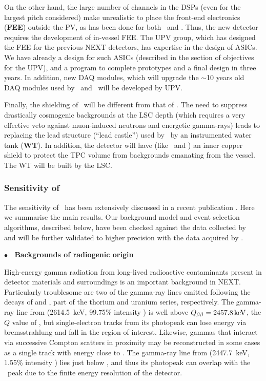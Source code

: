 \indent

On the other hand, the large number of channels in the DSPs (even for the largest pitch considered) make unrealistic to place the front-end electronics ({\bf FEE}) outside the PV, as has been done for both \NEW\ and \Next. Thus, the new detector requires the development of in-vessel FEE. The UPV group, which has designed the FEE for the previous NEXT detectors, has expertise in the design of ASICs. We have already a design for such ASICs (described in the section of objectives for the UPV), and a program to complete prototypes and a final design in three years. In addition, new DAQ modules, which will upgrade the $\sim$10 years old DAQ modules used by \NEW\ and \Next\ will be developed by UPV. 

\indent

Finally, the shielding of \NHD\ will be different from that of \Next. The need to suppress drastically cosmogenic backgrounds at the LSC depth (which requires a very effective veto against muon-induced neutrons and energetic gamma-rays) leads to replacing the lead structure (``lead castle'') used by \Next\ by an instrumented water tank ({\bf WT}). In addition, the detector will have (like \NEW\ and \Next) an inner copper shield to protect the TPC volume from backgrounds emanating from the vessel. The WT will be built by the LSC. 


\subsubsection{Sensitivity of \NHD}
\label{sec:BackgroundsAtTheTonneScale}

The sensitivity of \NHD\ has been extensively discussed in a recent publication \cite{NEXT:2020amj}. Here we summarise the main results. 
Our background model and event selection algorithms, described below, have been checked against the data collected by \NEW\ \cite{Novella:2019cne} and will be further validated to higher precision with the data acquired  by \Next. 

\indent

{\bf $\bullet$~ Backgrounds of radiogenic origin}

\indent
High-energy gamma radiation from long-lived radioactive contaminants present in detector materials and surroundings is an important background in NEXT. Particularly troublesome are two of the gamma-ray lines emitted following the decays of  and , part of the thorium and uranium series, respectively. The gamma-ray line from  (2614.5~keV, 99.75\% intensity \cite{nudat}) is well above $\Qbb=\SI{2457.8}{\kilo\eV}$, the $Q$ value of , but single-electron tracks from its photopeak can lose energy via bremsstrahlung and fall in the region of interest. Likewise, gammas that interact via successive Compton scatters in proximity may be reconstructed in some cases as a single track with energy close to \Qbb. The gamma-ray line from  (2447.7~keV, 1.55\% intensity \cite{nudat}) lies just below \Qbb, and thus its photopeak can overlap with the \bbonu\ peak due to the finite energy resolution of the detector.


